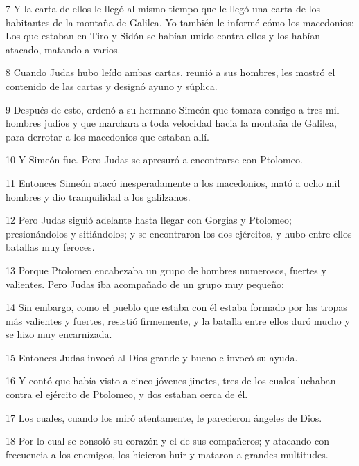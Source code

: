 \par 7 Y la carta de ellos le llegó al mismo tiempo que le llegó una carta de los habitantes de la montaña de Galilea. Yo también le informé cómo los macedonios; Los que estaban en Tiro y Sidón se habían unido contra ellos y los habían atacado, matando a varios.

\par 8 Cuando Judas hubo leído ambas cartas, reunió a sus hombres, les mostró el contenido de las cartas y designó ayuno y súplica.

\par 9 Después de esto, ordenó a su hermano Simeón que tomara consigo a tres mil hombres judíos y que marchara a toda velocidad hacia la montaña de Galilea, para derrotar a los macedonios que estaban allí.

\par 10 Y Simeón fue. Pero Judas se apresuró a encontrarse con Ptolomeo.

\par 11 Entonces Simeón atacó inesperadamente a los macedonios, mató a ocho mil hombres y dio tranquilidad a los galilzanos.

\par 12 Pero Judas siguió adelante hasta llegar con Gorgias y Ptolomeo; presionándolos y sitiándolos; y se encontraron los dos ejércitos, y hubo entre ellos batallas muy feroces.

\par 13 Porque Ptolomeo encabezaba un grupo de hombres numerosos, fuertes y valientes. Pero Judas iba acompañado de un grupo muy pequeño:

\par 14 Sin embargo, como el pueblo que estaba con él estaba formado por las tropas más valientes y fuertes, resistió firmemente, y la batalla entre ellos duró mucho y se hizo muy encarnizada.

\par 15 Entonces Judas invocó al Dios grande y bueno e invocó su ayuda.

\par 16 Y contó que había visto a cinco jóvenes jinetes, tres de los cuales luchaban contra el ejército de Ptolomeo, y dos estaban cerca de él.

\par 17 Los cuales, cuando los miró atentamente, le parecieron ángeles de Dios.

\par 18 Por lo cual se consoló su corazón y el de sus compañeros; y atacando con frecuencia a los enemigos, los hicieron huir y mataron a grandes multitudes.

